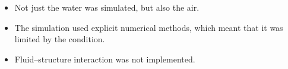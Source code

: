 \begin{itemize}
\end{itemize}

\HRule

\begin{itemize}
    \item Not just the water was simulated, but also the air. %
    
    \item The simulation used explicit numerical methods, which meant that it was limited by the \CFL condition. %
    
    \item Fluid--structure interaction was not implemented. %
\end{itemize}